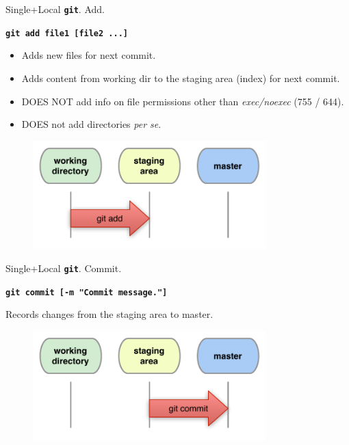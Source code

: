 \documentclass{beamer}
\newcommand{\git}{\texttt{\textbf{git}}\xspace}
\begin{document}
\begin{frame}{Single+Local \git. Add.}
  \begin{center}
    \texttt{\textbf{git add file1 [file2 ...]}}
  \end{center}
  \begin{itemize}
  \item Adds new files for next commit.
  \item Adds content from working dir to the staging area (index) for
    next commit.
  \item DOES NOT add info on file permissions other than \emph{exec/noexec}
    (755 / 644).
  \item DOES not add directories \emph{per se}.
  \end{itemize}
  \begin{figure}
    \centering
    \includegraphics[width=9cm]{figs/local-add}
  \end{figure}
\end{frame}

\begin{frame}{Single+Local \git. Commit.}
  \begin{center}
    \texttt{\textbf{git commit [-m "Commit message."]}}
  \end{center}
  Records changes from the staging area to master.
  \begin{figure}
    \centering
    \includegraphics[width=9cm]{figs/local-commit}
  \end{figure}
\end{frame}
\end{document}
